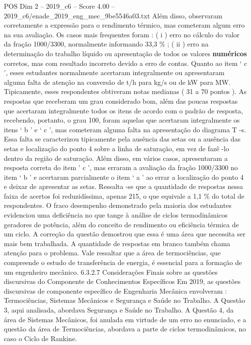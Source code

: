 \begin{textsample}{POS Dim 2 – 2019\_c6 – Score 4.00 – 2019\_c6/enade\_2019\_eng\_mec\_9be5546a03.txt}
Além disso, observaram corretamente a expressão para o rendimento térmico, mas cometeram algum erro na sua avaliação.
Os casos mais frequentes foram : ( i ) erro no cálculo do valor da fração 1000/3300, normalmente informando 33,3 \% ; ( ii ) erro na determinação do trabalho líquido ou apresentação de todos os valores \textbf{numéricos} corretos, mas com resultado incorreto devido a erro de contas.
Quanto ao item ‘ c ’, esses estudantes normalmente acertaram integralmente ou apresentaram alguma falta de atenção na conversão de t/h para kg/s ou de kW para MW.
Tipicamente, esses respondentes obtiveram notas medianas ( 31 a 70 pontos ).
As respostas que receberam um grau considerado bom, além das poucas respostas que acertaram integralmente todos os itens de acordo com o padrão de resposta, recebendo, portanto, o grau 100, foram aquelas que acertaram integralmente os itens ‘ b ’ e ‘ c ’, mas cometeram alguma falta na apresentação do diagrama T -s.
Essa falta se caracterizou tipicamente pela ausência das setas ou a ausência das setas e localização do ponto 4 sobre a linha de saturação, em vez de fazê -lo dentro da região de saturação.
Além disso, em vários casos, apresentaram a resposta correta do item ’ c ’, mas erraram a avaliação da fração 1000/3300 no item ‘ b ’ e acertaram parcialmente o item ‘ a ’ ao errar a localização do ponto 4 e deixar de apresentar as setas.
Ressalta -se que a quantidade de respostas nessa faixa de acertos foi reduzidíssima, apenas 215, o que equivale a 1,1 \% do total de respondentes.
O fraco desempenho demonstrado pela maioria dos estudantes evidenciou uma deficiência no que tange à análise de ciclos termodinâmicos geradores de potência, além do conceito de rendimento ou eficiência térmica de um ciclo.
A correção da questão demostrou que essa é uma área que necessita ser mais bem trabalhada.
A quantidade de respostas em branco também chama atenção para o problema.
Vale ressaltar que a área de termociências, que compreende o estudo de transferência de energia, é essencial para a formação de um engenheiro mecânico. 6.3.2.7 Considerações Finais sobre as questões discursivas do Componente de Conhecimentos Específicos Em 2019, as questões discursivas de componente específico de Engenharia Mecânica envolveram : Termociências, Sistemas Mecânicos e Segurança e Saúde no Trabalho.
A Questão 3, aqui analisada, abordava Segurança e Saúde no Trabalho.
A Questão 4, da área de Sistemas Mecânicos, foi anulada em virtude de um erro no enunciado, e a questão da área de Termociências, abordava a parte de ciclos termodinâmicos, no caso o Ciclo de Rankine.

\end{textsample}
